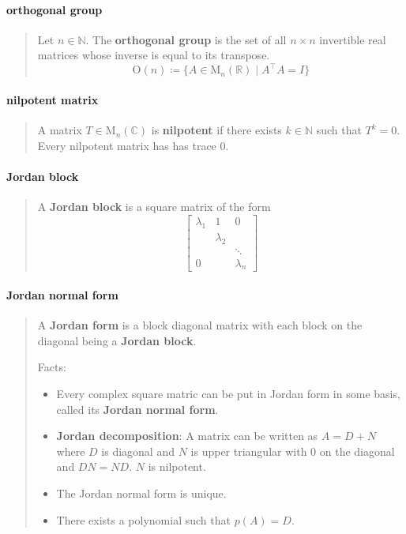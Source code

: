 \documentclass[letterpaper, 10pt]{article}
\theoremstyle{theostyle}
\begin{document}
\paragraph{orthogonal group}
\begin{quote}
    Let \(n \in \mathbb{N}\).
    The \textbf{orthogonal group} is the set of all \(n \times n\) invertible real matrices whose inverse is equal to its transpose.
    \[\mathrm{O}(n) \coloneqq \{A \in \mathrm{M}_n (\mathbb{R}) \mid A^\top A = I\}\]
\end{quote}

\paragraph{nilpotent matrix}
\begin{quote}
    A matrix \(T \in \mathrm{M}_n(\mathbb{C})\) is \textbf{nilpotent} if there exists \(k \in \mathbb{N}\) such that \(T^k= 0\).
    Every nilpotent matrix has has trace \(0\).
\end{quote}

\paragraph{Jordan block}
\begin{quote}
    A \textbf{Jordan block} is a square matrix of the form
    \[\begin{bmatrix}
        \lambda_1 & 1 & 0 \\
        & \lambda_2 & \\
        & & \ddots \\
        0 & & \lambda_n
    \end{bmatrix}\]
\end{quote}

\paragraph{Jordan normal form}
\begin{quote}
    A \textbf{Jordan form} is a block diagonal matrix with each block on the diagonal being a \textbf{Jordan block}.

    Facts:
    \begin{itemize}
    \item Every complex square matric can be put in Jordan form in some basis, called its \textbf{Jordan normal form}.
    \item \textbf{Jordan decomposition}: A matrix can be written as \(A = D + N\) where \(D\) is diagonal and \(N\) is upper triangular with \(0\) on the diagonal and \(DN = ND\).
    \(N\) is nilpotent.
    \item The Jordan normal form is unique.
    \item There exists a polynomial such that \(p(A) = D\).
    \end{itemize}
\end{quote}
\end{document}
